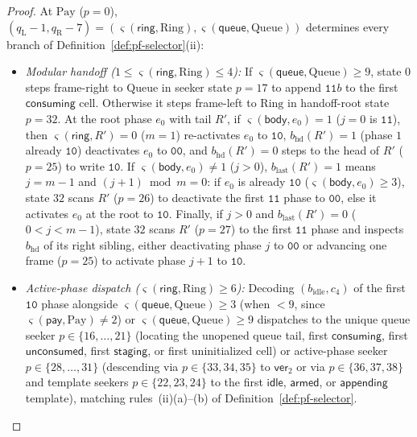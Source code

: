 \documentclass[11pt,reqno]{amsart}
\numberwithin{equation}{section}
\theoremstyle{plain}
\theoremstyle{definition}
\theoremstyle{remark}
\begin{document}
\begin{proof}
At $\mathrm{Pay}$ ($p = 0$), $(q_{\mathrm{L}} - 1, q_{\mathrm{R}} - 7) = (\varsigma(\mathsf{ring}, \mathrm{Ring}), \varsigma(\mathsf{queue}, \mathrm{Queue}))$ determines every branch of Definition~\ref{def:pf-selector}(ii):
\begin{itemize}[leftmargin=2.0em]
  \item \emph{Modular handoff ($1 \le \varsigma(\mathsf{ring}, \mathrm{Ring}) \le 4$):} If $\varsigma(\mathsf{queue}, \mathrm{Queue}) \ge 9$, state $0$ steps frame-right to $\mathrm{Queue}$ in seeker state $p = 17$ to append $\mathtt{11}b$ to the first $\mathsf{consuming}$ cell. Otherwise it steps frame-left to $\mathrm{Ring}$ in handoff-root state $p = 32$. At the root phase $e_0$ with tail $R'$, if $\varsigma(\mathsf{body}, e_0) = 1$ ($j = 0$ is $\mathtt{11}$), then $\varsigma(\mathsf{ring}, R') = 0$ ($m = 1$) re-activates $e_0$ to $\mathtt{10}$, $b_{\mathrm{hd}}(R') = 1$ (phase $1$ already $\mathtt{10}$) deactivates $e_0$ to $\mathtt{00}$, and $b_{\mathrm{hd}}(R') = 0$ steps to the head of $R'$ ($p = 25$) to write $\mathtt{10}$. If $\varsigma(\mathsf{body}, e_0) \ne 1$ ($j > 0$), $b_{\mathrm{last}}(R') = 1$ means $j = m - 1$ and $(j + 1) \bmod m = 0$: if $e_0$ is already $\mathtt{10}$ ($\varsigma(\mathsf{body}, e_0) \ge 3$), state $32$ scans $R'$ ($p = 26$) to deactivate the first $\mathtt{11}$ phase to $\mathtt{00}$, else it activates $e_0$ at the root to $\mathtt{10}$. Finally, if $j > 0$ and $b_{\mathrm{last}}(R') = 0$ ($0 < j < m - 1$), state $32$ scans $R'$ ($p = 27$) to the first $\mathtt{11}$ phase and inspects $b_{\mathrm{hd}}$ of its right sibling, either deactivating phase $j$ to $\mathtt{00}$ or advancing one frame ($p = 25$) to activate phase $j + 1$ to $\mathtt{10}$.
  \item \emph{Active-phase dispatch ($\varsigma(\mathsf{ring}, \mathrm{Ring}) \ge 6$):} Decoding $(b_{\mathrm{idle}}, c_4)$ of the first $\mathtt{10}$ phase alongside $\varsigma(\mathsf{queue}, \mathrm{Queue}) \ge 3$ (when $< 9$, since $\varsigma(\mathsf{pay}, \mathrm{Pay}) \ne 2$) or $\varsigma(\mathsf{queue}, \mathrm{Queue}) \ge 9$ dispatches to the unique queue seeker $p \in \{16,\dots,21\}$ (locating the unopened queue tail, first $\mathsf{consuming}$, first $\mathsf{unconsumed}$, first $\mathsf{staging}$, or first uninitialized cell) or active-phase seeker $p \in \{28,\dots,31\}$ (descending via $p \in \{33,34,35\}$ to $\mathsf{ver}_2$ or via $p \in \{36,37,38\}$ and template seekers $p \in \{22,23,24\}$ to the first $\mathsf{idle}$, $\mathsf{armed}$, or $\mathsf{appending}$ template), matching rules~(ii)(a)--(b) of Definition~\ref{def:pf-selector}.

\end{itemize}
\end{proof}
\end{document}
